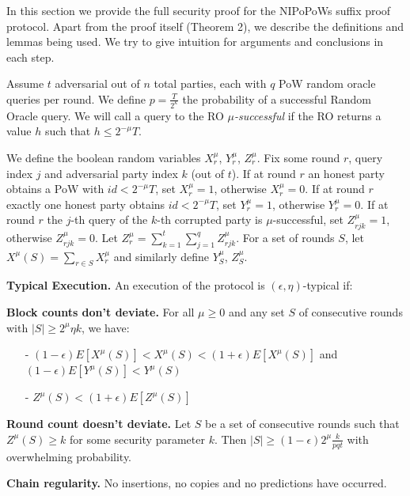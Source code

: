 In this section we provide the full security proof for the NIPoPoWs suffix proof
protocol\cite{NIPoPoWs}. Apart from the proof itself (Theorem 2), we describe the
definitions and lemmas being used. We try to give intuition for arguments and
conclusions in each step.

Assume $t$ adversarial out of $n$ total parties, each with $q$ PoW random oracle
queries per round. We define $p = \frac{T}{2^\kappa}$ the probability of a
successful Random Oracle query. We will call a query to the RO $\mu$\textit{-successful}
if the RO returns a value $h$ such that $h \leq 2^{-\mu}T$.

We define the boolean random variables $X_r^{\mu}$, $Y_r^{\mu}$, $Z_r^{\mu}$.
Fix some round $r$, query index $j$ and adversarial party index $k$ (out of $t$).
If at round $r$ an honest party obtains a PoW with $id < 2^{-\mu}T$, set $X_r^{\mu} = 1$,
otherwise $X_r^{\mu} = 0$. If at round $r$ exactly one honest party obtains
$id < 2^{-\mu}T$, set $Y_r^{\mu} = 1$, otherwise $Y_r^{\mu} = 0$. If at round $
r$ the $j$-th query of the $k$-th corrupted party is $\mu$-successful, set
$Z_{rjk}^{\mu} = 1$, otherwise $Z_{rjk}^{\mu} = 0$. Let $Z_r^{\mu} =
\sum_{k=1}^t\sum_{j=1}^qZ_{rjk}^{\mu}$. For a set of rounds $S$, let
$X^\mu(S) = \sum_{r \in S}X^{\mu}_r$ and similarly define $Y_S^{\mu}$, $Z_S^{\mu}$.\\

\begin{defn}{\textbf{Typical Execution.}}
	An execution of the protocol is $(\epsilon, \eta)$-typical if:
	
	\textbf{Block counts don't deviate.} For all $\mu \geq 0$ and any set
	$S$ of consecutive rounds with $\vert S \vert \geq 2^\mu \eta k$, we have:
	\begin{itemize}
		\item[-] $(1-\epsilon)E[X^\mu(S)] < X^\mu(S) < (1+\epsilon)E[X^\mu(S)] $ and
			$(1-\epsilon)E[Y^\mu(S)] < Y^\mu(S)$
		\item[-] $Z^\mu(S) < (1+\epsilon)E[Z^\mu(S)]$
\end{itemize}

	\textbf{Round count doesn't deviate.} Let $S$ be a set of consecutive rounds
	such that $Z^\mu(S) \geq k$ for some security parameter $k$. Then $\vert S \vert
	\geq (1-\epsilon)2^\mu \frac{k}{pqt}$ with overwhelming probability.
	
	\textbf{Chain regularity.} No insertions, no copies and no predictions
	\cite{Backbone} have occurred.
	\label{defn:typical_execution}
\end{defn}

